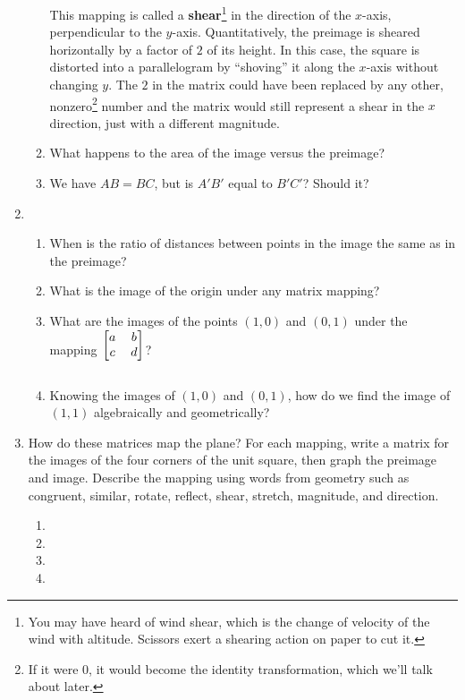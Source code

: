 \documentclass[../gatm.tex]{subfiles}
\begin{document}
\begin{enumerate}
\begin{enumerate}
This mapping is called a \textbf{shear}\footnote{You may have heard of wind shear, which is the change of velocity of the wind with altitude. Scissors exert a shearing action on paper to cut it.} in the direction of the $x$-axis, perpendicular to the $y$-axis. Quantitatively, the preimage is sheared horizontally by a factor of $2$ of its height. In this case, the square is distorted into a parallelogram by ``shoving'' it along the $x$-axis without changing $y$. The $2$ in the matrix could have been replaced by any other, nonzero\footnote{If it were $0$, it would become the identity transformation, which we'll talk about later.} number and the matrix would still represent a shear in the $x$ direction, just with a different magnitude.
\item What happens to the area of the image versus the preimage?
\item We have $AB=BC$, but is $A'B'$ equal to $B'C'$? Should it?
\end{enumerate}
\item \begin{enumerate}
\item When is the ratio of distances between points in the image the same as in the preimage?
\item What is the image of the origin under any matrix mapping?
\item What are the images of the points $(1,0)$ and $(0,1)$ under the mapping $\begin{blockarray}{[cc]} a & b \\ c & d \end{blockarray}$?
\item Knowing the images of $(1,0)$ and $(0,1)$, how do we find the image of $(1,1)$ algebraically and geometrically?
\end{enumerate}
\item How do these matrices map the plane? For each mapping, write a matrix for the images of the four corners of the unit square, then graph the preimage and image. Describe the mapping using words from geometry such as congruent, similar, rotate, reflect, shear, stretch, magnitude, and direction. \label{prob:map_plane_sixteen_matrices}
\begin{multicols}{4}
\begin{enumerate}
\item {}
\item {}
\item {}
\item {}

\end{enumerate}
\end{multicols}
\end{enumerate}
\end{document}
